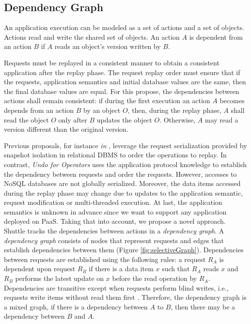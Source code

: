 \subsection{Dependency Graph}
\label{sec:arch:dependencies}
An application execution can be modeled as a set of actions and a set of objects. Actions read and write the shared set of objects. An action $A$ is dependent from an action $B$ if $A$ reads an object's version written by $B$.

Requests must be replayed in a consistent manner to obtain a consistent application after the replay phase. The request replay order must ensure that if the requests, application semantics and initial database values are the same, then the final database values are equal. For this propose, the dependencies between actions shall remain consistent: if during the first execution an action $A$ becomes depends from an action $B$ by an object $O$, then, during the replay phase, $A$ shall read the object $O$ only after $B$ updates the object $O$. Otherwise, $A$ may read a version different than the original version.

Previous proposals, for instance \emph{in} \cite{goel}, leverage the request serialization provided by snapshot isolation in relational \ac{DBMS} to order the operations to replay. In contrast, \textit{Undo for Operators} \cite{undoForOperators} uses the application protocol knowledge to establish the dependency between requests and order the requests. However, accesses to \acs{NoSQL} databases are not globally serialized. Moreover, the data items accessed during the replay phase may change due to updates to the application semantic, request modification or multi-threaded execution. At last, the application semantics is unknown in advance since we want to support any application deployed on \ac{PaaS}. Taking that into account, we propose a novel approach.\\


Shuttle tracks the dependencies between actions in a \textit{dependency graph}. A \emph{dependency graph} consists of nodes that represent requests and edges that establish dependencies between them (Figure \ref{fig:selectiveGraph}).  Dependencies between requests are established using the following rules: a request $R_A$ is dependent upon request $R_B$ if there is a data item $x$ such that $R_A$ reads $x$ and $R_B$ performs the latest update on $x$ before the read operation by $R_A$. Dependencies are transitive except when requests perform blind writes, i.e., requests write items without read them first \cite{Ammann2002}. Therefore, the dependency graph is a mixed graph, if there is a dependency between $A$ to $B$, then there may be a dependency between $B$ and $A$.



